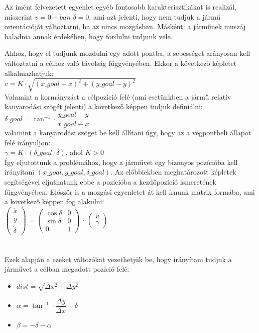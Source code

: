 Az imént felvezetett egyenlet egyéb fontosabb karakterisztikákat is realizál, miszerint $ v = 0-ban$ $ \delta = 0 $, ami azt jelenti, hogy nem tudjuk a jármű orientációját változtatni, ha az nincs mozgásban. Másként: a járműnek muszáj haladnia annak érdekében, hogy fordulni tudjunk vele. 

Ahhoz, hogy el tudjunk mozdulni egy adott pontba, a sebességet arányosan kell változtatni a célhoz való távolság függvényében. Ekkor a következő képletet alkalmazhatjuk:\\

$ v = K \cdot \sqrt{(x\_goal - x)^2 + (y\_goal - y) ^2}$ \\

Valamint a kormányzást a célpozíció felé (ami esetünkben a jármű relatív kanyarodási szögét jelenti) a következő képpen tudjuk definiálni:\\

$ \delta\_goal = \tan^{-1} \cdot \dfrac{y\_goal - y}{x\_goal - x} $\\

valamint a kanyarodási szöget be kell állítani úgy, hogy az a végpontbeli állapot felé irányuljon:\\

$ \gamma = K \cdot ( \delta\_goal \cdot \delta ) $, \qquad ahol $ K > 0 $\\

Így eljutottunk a problémához, hogy a járművet egy bizonyos pozícióba kell irányítani $ (x\_goal, y\_goal, \delta\_goal) $. Az előbbiekben meghatározott képletek segítségével eljuthatunk ebbe a pozícióba a kezdőpozíció ismeretének függvényében. Először is a mozgási egyenletet át kell írnunk mátrix formába, ami a következő képpen fog alakulni:\\

\( \begin{pmatrix}
	\dot{x}\\
	\dot{y}\\
	\dot{\delta}
\end{pmatrix} \)
=
\( \begin{pmatrix}
	\cos\delta & 0\\
	\sin\delta & 0\\
	0 & 1
\end{pmatrix} \)
$ \cdot $ 
\( \begin{pmatrix}
	v\\
	\gamma
\end{pmatrix} \)
\\\\\\
Ezek alapján a ezeket változókat vezethetjük be, hogy irányítani tudjuk a járművet a célban megadott pozíció felé:
\begin{itemize}
	\item[] $ dist = \sqrt{\Delta x^2 + \Delta y^2} $
	\item[] $ \alpha = \tan^{-1} \cdot \dfrac{\Delta y}{\Delta x} - \delta $
	\item[] $ \beta = -\delta - \alpha $
\end{itemize}
 
